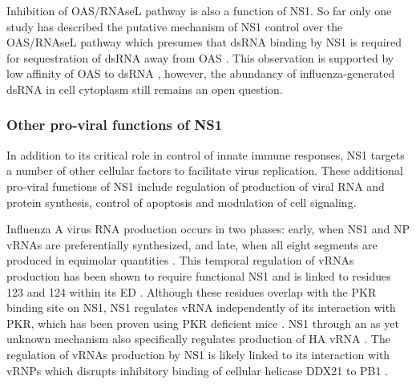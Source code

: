 		Inhibition of \gls{OAS}/\gls{RNAseL} pathway is also a function of \gls{NS1}. So far only one study has described the putative mechanism of \gls{NS1} control over the \gls{OAS}/\gls{RNAseL} pathway which presumes that dsRNA binding by NS1 is required for sequestration of dsRNA away from \gls{OAS} \parencite{Min2006}. This observation is supported by low affinity of \gls{OAS} to dsRNA \parencite{Hartmann2003}, however, the abundancy of influenza-generated dsRNA in cell cytoplasm still remains an open question.
		
		\subsubsection{Other pro-viral functions of NS1} \label{sec:pro-viral}
		
		In addition to its critical role in control of innate immune responses, NS1 targets a number of other cellular factors to facilitate virus replication. These additional pro-viral functions of NS1 include regulation of production of viral RNA and protein synthesis, control of apoptosis and modulation of cell signaling.
		
		Influenza A virus RNA production occurs in two phases: early, when \gls{NS1} and \gls{NP} vRNAs are preferentially synthesized, and late, when all eight segments are produced in equimolar quantities \parencite{Shapiro1987, Skehel1973}. This temporal regulation of vRNAs production has been shown to require functional \gls{NS1} \parencite{Falcon2004} and is linked to residues 123 and 124 within its ED \parencite{Min2007}. Although these residues overlap with the \gls{PKR} binding site on NS1, NS1 regulates vRNA independently of its interaction with PKR, which has been proven using PKR deficient mice \parencite{Min2007}. NS1 through an as yet unknown mechanism also specifically regulates production of HA vRNA \parencite{Maamary2012}. The regulation of vRNAs production by NS1 is likely linked to its interaction with \gls{vRNP}s which disrupts inhibitory binding of cellular helicase DDX21 to PB1 \parencite{Marion1997a, Chen2014}.
		
